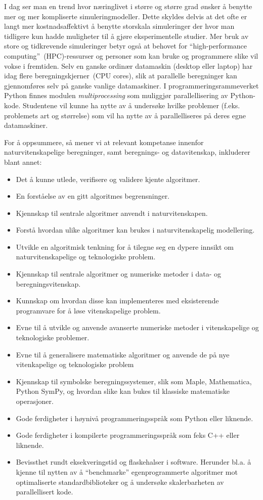 \documentclass{article}
\begin{document}
I dag ser man en trend hvor næringlivet i større og større grad ønsker å benytte mer og mer kompliserte simuleringmodeller. Dette skyldes delvis at det ofte er langt mer kostnadsaffektivt å benytte storskala simuleringer der hvor man tidligere kun hadde muligheter til å gjøre eksperimentelle studier. Mer bruk av store og tidkrevende simuleringer betyr også at behovet for ``high-performance computing''~(HPC)-ressurser og personer som kan bruke og programmere slike vil vokse i fremtiden. Selv en ganske ordinær datamaskin (desktop eller laptop) har idag flere beregningskjerner~(CPU cores), slik at parallelle beregninger kan gjennomføres selv på ganske vanlige datamaskiner.
I programmeringsrammeverket Python finnes modulen \emph{multiprocessing} som muliggjør parallellisering av Python-kode.
Studentene vil kunne ha nytte av å undersøke hvilke problemer (f.eks. problemets art og størrelse) som vil ha nytte av å parallelliseres på deres egne datamaskiner.

For å oppsummere, så mener vi at relevant kompetanse innenfor naturvitenskapelige beregninger, samt beregnings- og datavitenskap, inkluderer blant annet:
\begin{itemize}
  \item Det å kunne utlede, verifisere og validere kjente algoritmer.
  \item En forståelse av en gitt algoritmes begrensninger.
  \item Kjennskap til sentrale algoritmer anvendt i naturvitenskapen.
  \item Forstå hvordan ulike algoritmer kan brukes i naturvitenskapelig modellering.
  \item Utvikle en algoritmisk tenkning for å tilegne seg en dypere innsikt om naturvitenskapelige og teknologiske problem.
  \item Kjennskap til sentrale algoritmer og numeriske metoder i data- og beregningsvitenskap.
  \item Kunnskap om hvordan disse kan implementeres med eksisterende programvare for å løse vitenskapelige problem.
  \item Evne til å utvikle og anvende avanserte numeriske metoder i vitenskapelige og teknologiske problemer.
  \item Evne til å generalisere matematiske algoritmer og anvende de på nye vitenkapelige og teknologiske problem
  \item Kjennskap til symbolske beregningssystemer, slik som Maple, Mathematica, Python SymPy, og hvordan slike kan bukes til klassiske matematiske operasjoner.
  \item Gode ferdigheter i høynivå programmeringsspråk som Python eller liknende.
  \item Gode ferdigheter i kompilerte programmeringsspråk som feks C++ eller liknende.
  \item Bevissthet rundt eksekveringstid og flaskehalser i software. Herunder bl.a. å kjenne til nytten av å  ``benchmarke'' egenprogrammerte algoritmer mot optimaliserte standardbiblioteker og å undersøke skalerbarheten av parallellisert kode.
\end{itemize}
\end{document}
